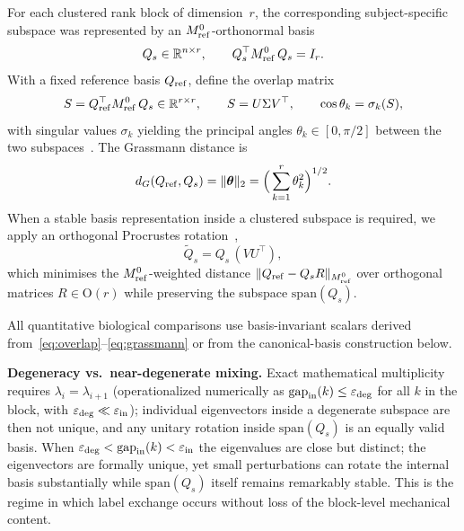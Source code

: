 \documentclass[11pt]{article}
\begin{document}
For each clustered rank block of dimension~$r$, the corresponding subject-specific subspace was represented by an $M_{\rm ref}^{0}$-orthonormal basis
\begin{equation}
Q_s\in\mathbb R^{n\times r},\qquad Q_s^\top M_{\rm ref}^{0}\,Q_s=I_r.
\end{equation}
With a fixed reference basis $Q_{\rm ref}$, define the overlap matrix
\begin{equation}
S=Q_{\rm ref}^\top M_{\rm ref}^{0}\,Q_s\in\mathbb R^{r\times r},\qquad S=U\Sigma V^\top,\qquad \cos\theta_k=\sigma_k(S),
\label{eq:overlap}
\end{equation}
with singular values $\sigma_k$ yielding the principal angles $\theta_k\in[0,\pi/2]$ between the two subspaces~\citep{BjorckGolub1973Angles}.
The Grassmann distance is
\begin{equation}
d_G(Q_{\rm ref},Q_s)=\|\boldsymbol\theta\|_2=\Big(\sum_{k=1}^{r}\theta_k^2\Big)^{1/2}.
\label{eq:grassmann}
\end{equation}
When a stable basis representation inside a clustered subspace is required, we apply an orthogonal Procrustes rotation~\citep{Schoenemann1966Procrustes},
\begin{equation}
\widetilde Q_s=Q_s\,(V U^\top),
\label{eq:procrustes}
\end{equation}
which minimises the $M_{\rm ref}^{0}$-weighted distance $\|Q_{\rm ref} - Q_s R\|_{M_{\rm ref}^0}$ over orthogonal matrices $R\in\mathrm O(r)$ while preserving the subspace $\mathrm{span}(Q_s)$.

All quantitative biological comparisons use basis-invariant scalars derived from~\eqref{eq:overlap}--\eqref{eq:grassmann} or from the canonical-basis construction below.

\noindent\textbf{Degeneracy vs.\ near-degenerate mixing.}
Exact mathematical multiplicity requires $\lambda_i = \lambda_{i+1}$ (operationalized numerically as $\mathrm{gap}_{\rm in}(k)\le\varepsilon_{\rm deg}$ for all $k$ in the block, with $\varepsilon_{\rm deg}\ll\varepsilon_{\rm in}$); individual eigenvectors inside a degenerate subspace are then not unique, and any unitary rotation inside $\mathrm{span}(Q_s)$ is an equally valid basis.
When $\varepsilon_{\rm deg}<\mathrm{gap}_{\rm in}(k)<\varepsilon_{\rm in}$ the eigenvalues are close but distinct; the eigenvectors are formally unique, yet small perturbations can rotate the internal basis substantially while $\mathrm{span}(Q_s)$ itself remains remarkably stable.
This is the regime in which label exchange occurs without loss of the block-level mechanical content.
\end{document}
